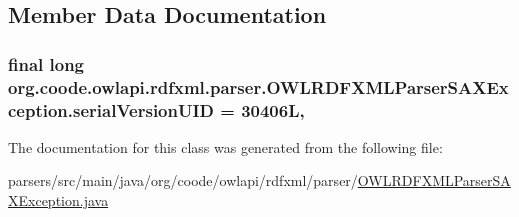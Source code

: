 \subsection{Member Data Documentation}
\hypertarget{classorg_1_1coode_1_1owlapi_1_1rdfxml_1_1parser_1_1_o_w_l_r_d_f_x_m_l_parser_s_a_x_exception_a4ad8c064f9d10904e27efbc81320f5ca}{
\subsubsection[{serial\-Version\-U\-I\-D}]{\setlength{\rightskip}{0pt plus 5cm}final long org.\-coode.\-owlapi.\-rdfxml.\-parser.\-O\-W\-L\-R\-D\-F\-X\-M\-L\-Parser\-S\-A\-X\-Exception.\-serial\-Version\-U\-I\-D = 30406\-L\hspace{0.3cm}{\ttfamily [static]}, {\ttfamily [private]}}}\label{classorg_1_1coode_1_1owlapi_1_1rdfxml_1_1parser_1_1_o_w_l_r_d_f_x_m_l_parser_s_a_x_exception_a4ad8c064f9d10904e27efbc81320f5ca}


The documentation for this class was generated from the following file\-:\begin{DoxyCompactItemize}
\item 
parsers/src/main/java/org/coode/owlapi/rdfxml/parser/\hyperlink{_o_w_l_r_d_f_x_m_l_parser_s_a_x_exception_8java}{O\-W\-L\-R\-D\-F\-X\-M\-L\-Parser\-S\-A\-X\-Exception.\-java}\end{DoxyCompactItemize}
